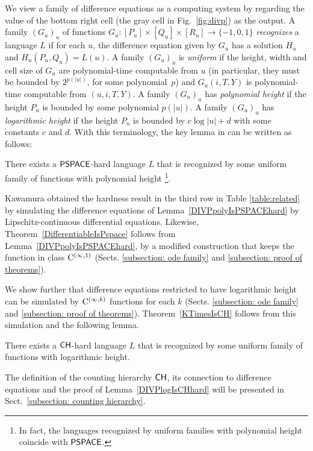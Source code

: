 We view a family of difference equations as a computing system by
regarding the value of the bottom right cell (the gray cell in Fig.~\ref{fig:divp}) as the output. 
A family $(G_u)_u$ of functions 
$G_u \colon [P_u] \times [Q_u] \times [R_u] \to \{-1, 0, 1\}$
\emph{recognizes} a language $L$ if for each $u$,
the difference equation given by $G_u$ has a solution $H_u$ 
and $H_u(P_u, Q_u) = L(u)$.
A family $(G_u)_u$ is \emph{uniform} 
if the height, width and cell size of $G_u$ are 
polynomial-time computable from $u$ (in particular, 
they must be bounded by $2^{p(|u|)}$, for some polynomial~$p$)
and $G_u(i, T, Y)$ is polynomial-time computable from $(u, i, T, Y)$.
A family $(G_u)_u$ has \emph{polynomial height} if the height $P_u$ is bounded by some polynomial $p(|u|)$.
A family $(G_u)_u$ has \emph{logarithmic height} if the height $P_u$ is bounded by $c \log |u| + d$ with some constants $c$ and $d$.
With this terminology,
the key lemma in 
\cite[Lemma 4.7]{kawamura2010lipschitz} 
can be written as follows:
\begin{lemma}
 \label{DIVPpolyIsPSPACEhard}
 There exists a $\mathsf{PSPACE}$-hard language $L$ that is recognized by some uniform family of functions with polynomial height%
 \footnote{In fact, the languages recognized by 
 uniform families with polynomial height coincide with $\mathsf{PSPACE}$.
}.
\end{lemma}

Kawamura obtained the hardness result in the third row in Table \ref{table:related} 
by simulating the difference equations of Lemma~\ref{DIVPpolyIsPSPACEhard}
by Lipschitz-continuous differential equations. 
Likewise, 
Theorem~\ref{DifferentiableIsPspace} follows from Lemma~\ref{DIVPpolyIsPSPACEhard},
by a modified construction that keeps 
the function in class $\mathrm C ^{(\infty, 1)}$ 
(Sects. \ref{subsection: ode family} and \ref{subsection: proof of theorems}).

We show further that 
difference equations restricted to have logarithmic height can be simulated by
$\mathrm C ^{(\infty, k)}$ functions for each $k$ 
(Sects. \ref{subsection: ode family} and \ref{subsection: proof of theorems}).
Theorem~\ref{KTimesIsCH} follows from this simulation and the following lemma.
\begin{lemma}
 \label{DIVPlogIsCHhard}
 There exists a $\mathsf{CH}$-hard language $L$ that is recognized by some uniform family of functions with logarithmic height.
\end{lemma}

The definition of the counting hierarchy $\mathsf{CH}$, 
its connection to difference equations and 
the proof of Lemma~\ref{DIVPlogIsCHhard} 
will be presented in Sect.~\ref{subsection: counting hierarchy}. 



